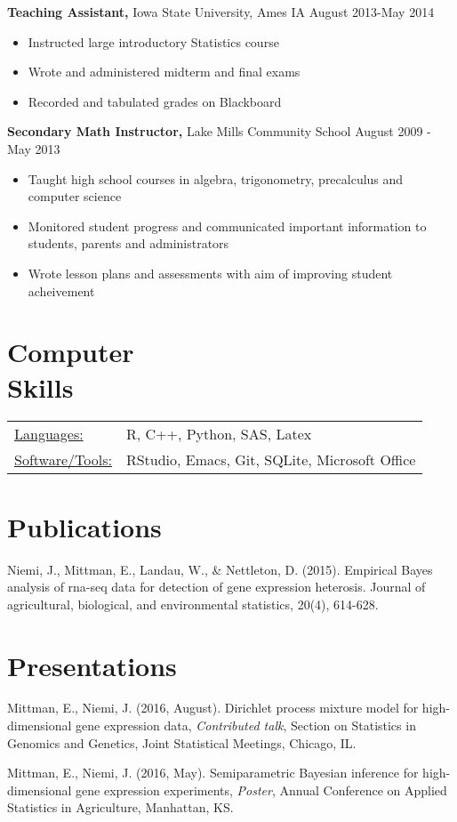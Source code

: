 \documentclass[margin]{res}
\begin{document}
\begin{resume}
{\bf Teaching Assistant,} Iowa State University, Ames IA \hfill August 2013-May 2014
\begin{itemize} \itemsep -2pt
\item Instructed large introductory Statistics course
\item Wrote and administered midterm and final exams
\item Recorded and tabulated grades on Blackboard
\end{itemize}

{\bf Secondary Math Instructor,} Lake Mills Community School \hfill
August 2009 - May 2013                
                \begin{itemize} \itemsep -2pt
                 \item  Taught high school courses in algebra, trigonometry, precalculus and computer science
                 \item Monitored student progress and communicated important information to students, parents and administrators
                 \item Wrote lesson plans and assessments with aim of improving student acheivement

		 \end{itemize}



\section{Computer \\ Skills}
   \begin{tabular}{l p{3in}}
    \underline{Languages:} & R, C++, Python, SAS, Latex\\
    \underline{Software/Tools:} &  RStudio, Emacs, Git, SQLite, Microsoft Office
 \end{tabular}

\section{Publications}
Niemi, J., Mittman, E., Landau, W., \& Nettleton, D. (2015).
Empirical Bayes analysis of rna-seq data for detection of gene expression heterosis. Journal of agricultural, biological, and environmental statistics, 20(4), 614-628.

\section{Presentations}
Mittman, E., Niemi, J. (2016, August). Dirichlet process mixture model for high-dimensional
gene expression data, {\em Contributed talk}, Section on Statistics in Genomics and Genetics, Joint Statistical Meetings, Chicago, IL. 

Mittman, E., Niemi, J. (2016, May). Semiparametric Bayesian inference for high-dimensional gene expression experiments, {\em Poster}, Annual Conference on Applied Statistics in Agriculture, Manhattan, KS.

\end{resume} 
\end{document}

